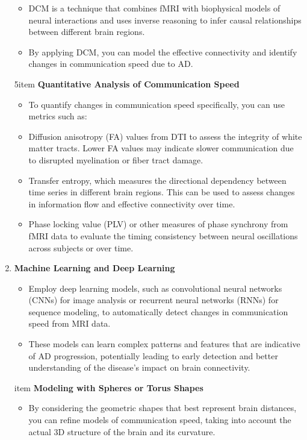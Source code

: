 \documentclass[twocolumn]{article}
\begin{document}
\begin{enumerate}
\begin{itemize}
\item DCM is a technique that combines fMRI with biophysical models of neural interactions and uses inverse reasoning to infer causal relationships between different brain regions.
\item By applying DCM, you can model the effective connectivity and identify changes in communication speed due to AD.
\end{itemize}
5item \textbf{Quantitative Analysis of Communication Speed}
\begin{itemize}
\item To quantify changes in communication speed specifically, you can use metrics such as:
  \item Diffusion anisotropy (FA) values from DTI to assess the integrity of white matter tracts. Lower FA values may indicate slower communication due to disrupted myelination or fiber tract damage.
  \item Transfer entropy, which measures the directional dependency between time series in different brain regions. This can be used to assess changes in information flow and effective connectivity over time.
  \item Phase locking value (PLV) or other measures of phase synchrony from fMRI data to evaluate the timing consistency between neural oscillations across subjects or over time.
\end{itemize}
\item \textbf{Machine Learning and Deep Learning}
\begin{itemize}
\item Employ deep learning models, such as convolutional neural networks (CNNs) for image analysis or recurrent neural networks (RNNs) for sequence modeling, to automatically detect changes in communication speed from MRI data.
\item These models can learn complex patterns and features that are indicative of AD progression, potentially leading to early detection and better understanding of the disease's impact on brain connectivity.
\end{itemize}
item \textbf{Modeling with Spheres or Torus Shapes}
\begin{itemize}
\item By considering the geometric shapes that best represent brain distances, you can refine models of communication speed, taking into account the actual 3D structure of the brain and its curvature.
\end{itemize}
\end{enumerate}
\end{document}
